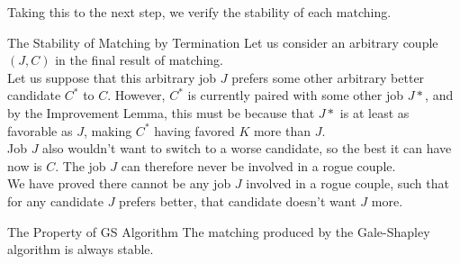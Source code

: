 Taking this to the next step, we verify the stability of each matching.
\begin{ln-think}{The Stability of Matching by Termination}{}
    Let us consider an arbitrary couple $(J, C)$ in the final result of matching. \\
    Let us suppose that this arbitrary job $J$ prefers some other arbitrary better candidate $C^*$ to $C$. However, $C^*$ is currently paired with some other job $J*$, and by the Improvement Lemma, this must be because that $J*$ is at least as favorable as $J$, making $C^*$ having favored $K$ more than $J$. \\
    Job $J$ also wouldn't want to switch to a worse candidate, so the best it can have now is $C$. The job $J$ can therefore never be involved in a rogue couple. \\
    We have proved there cannot be any job $J$ involved in a rogue couple, such that for any candidate $J$ prefers better, that candidate doesn't want $J$ more.
    \begin{ln-theorem}{The Property of GS Algorithm}{}
        The matching produced by the Gale-Shapley algorithm is always stable.
    \end{ln-theorem}
\end{ln-think}

